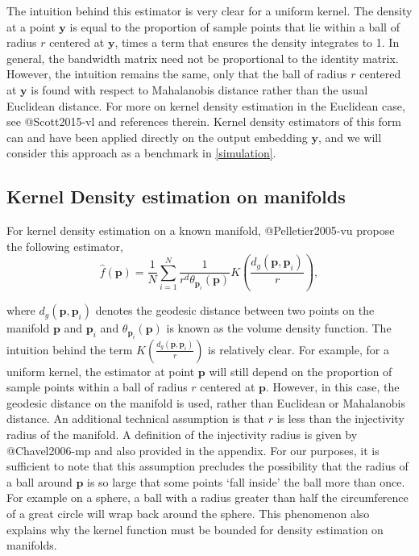 \documentclass[
]{article}
\begin{document}
The intuition behind this estimator is very clear for a uniform kernel.
The density at a point \(\bm{y}\) is equal to the proportion of sample
points that lie within a ball of radius \(r\) centered at \(\bm{y}\),
times a term that ensures the density integrates to 1. In general, the
bandwidth matrix need not be proportional to the identity matrix.
However, the intuition remains the same, only that the ball of radius
\(r\) centered at \(\bm{y}\) is found with respect to Mahalanobis
distance rather than the usual Euclidean distance. For more on kernel
density estimation in the Euclidean case, see @Scott2015-vl and
references therein. Kernel density estimators of this form can and have
been applied directly on the output embedding \(\bm{y}\), and we will
consider this approach as a benchmark in \autoref{simulation}.

\hypertarget{Pellet}{%
\subsection{Kernel Density estimation on manifolds}\label{Pellet}}

For kernel density estimation on a known manifold, @Pelletier2005-vu
propose the following estimator, \begin{equation}
\label{eq:denriem}
\hat{f}(\bm{p}) = \frac{1}{N} \sum_{i=1}^{N} \frac{1}{r^d \theta_{\bm{p}_i}(\bm{p})} K\left(\frac{d_g(\bm{p}, \bm{p}_i)}{r}\right),
\end{equation}

where \(d_g(\bm{p}, \bm{p}_i)\) denotes the geodesic distance between
two points on the manifold \(\bm{p}\) and \(\bm{p}_i\) and
\(\theta_{\bm{p}_i}(\bm{p})\) is known as the volume density function.
The intuition behind the term
\(K\left(\frac{d_g(\bm{p}, \bm{p}_i)}{r}\right)\) is relatively clear.
For example, for a uniform kernel, the estimator at point \(\bm{p}\)
will still depend on the proportion of sample points within a ball of
radius \(r\) centered at \(\bm{p}\). However, in this case, the geodesic
distance on the manifold is used, rather than Euclidean or Mahalanobis
distance. An additional technical assumption is that \(r\) is less than
the injectivity radius of the manifold. A definition of the injectivity
radius is given by @Chavel2006-mp and also provided in the appendix. For
our purposes, it is sufficient to note that this assumption precludes
the possibility that the radius of a ball around \(\bm{p}\) is so large
that some points `fall inside' the ball more than once. For example on a
sphere, a ball with a radius greater than half the circumference of a
great circle will wrap back around the sphere. This phenomenon also
explains why the kernel function must be bounded for density estimation
on manifolds.
\end{document}
